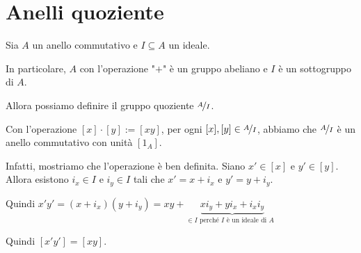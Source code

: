 \documentclass[../main.tex]{subfiles}
\begin{document}
\section{Anelli quoziente}

Sia $A$ un anello commutativo e $I \subseteq A$ un ideale.

In particolare, $A$ con l'operazione "$+$" è un gruppo abeliano e $I$ è un sottogruppo di $A$.

Allora possiamo definire il gruppo quoziente $\nicefrac{A}{I}$.

Con l'operazione $[x] \cdot [y] := [xy]$, per ogni $[x] , [y] \in \nicefrac{A}{I}$, abbiamo che $\nicefrac{A}{I}$ è un anello commutativo con unità $[1_A]$.

Infatti, mostriamo che l'operazione è ben definita. Siano $x' \in [x]$ e $y' \in [y]$. Allora esistono $i_x \in I$ e $i_y \in I$ tali che $x' = x + i_x$ e $y' = y + i_y$.

Quindi $x'y' = (x + i_x) (y + i_y) = xy + \underbrace{x i_y + y i_x + i_x i_y}_{\in I \text{ perché $I$ è un ideale di $A$ }}$

Quindi $[x'y'] = [xy]$.
\end{document}
